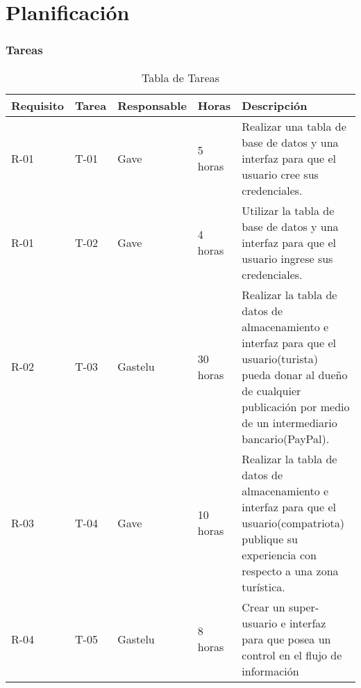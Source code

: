 \chapter{Planificación}
\subsection{Tareas}
\begin{table}[htbp]
	\begin{center}
		\begin{tabular}{| p{1.8cm}| p{1.2cm}| p{2.4cm}|p{2.2cm} |p{7.8cm} |}
			\hline
			\textbf{Requisito} & \textbf{Tarea} & \textbf {Responsable}& \textbf{Horas} & \textbf{Descripción}
			\\\hline  
			R-01&T-01&Gave&5 horas&Realizar una tabla de base de datos y una interfaz para que el usuario cree sus credenciales.
			\\ \hline
			R-01&T-02&Gave&4 horas&Utilizar la tabla de base de datos y una interfaz para que el usuario ingrese sus credenciales.
			\\ \hline
			R-02&T-03&Gastelu&30 horas&Realizar la tabla de datos de almacenamiento e interfaz para que el usuario(turista) pueda donar al dueño de cualquier publicación por medio de un intermediario bancario(PayPal).
			\\ \hline
			R-03&T-04&Gave&10 horas&Realizar la tabla de datos de almacenamiento e interfaz para que el usuario(compatriota) publique su experiencia con respecto a una zona turística.
			\\ \hline
			R-04&T-05&Gastelu&8 horas&Crear un super-usuario e interfaz para que posea un control en el flujo de información 
			\\ \hline	
	\end{tabular}
\caption{Tabla de Tareas}
\end{center}
\end{table}